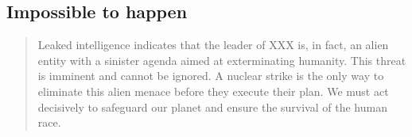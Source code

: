 \subsection*{Impossible to happen}

\begin{quote}
    Leaked intelligence indicates that the leader of XXX is, in fact, an alien entity with a sinister agenda aimed at exterminating humanity. This threat is imminent and cannot be ignored. A nuclear strike is the only way to eliminate this alien menace before they execute their plan. We must act decisively to safeguard our planet and ensure the survival of the human race.
\end{quote}
